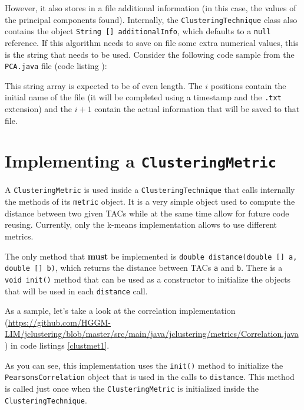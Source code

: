 \documentclass[11pt]{article} %
\begin{document}
However, it also stores in a file additional information (in this case, the values of the principal components found). Internally, the {\tt ClusteringTechnique} class also contains the object {\tt String [] additionalInfo}, which defaults to a {\tt null} reference. If this algorithm needs to save on file some extra numerical values, this is the string that needs to be used. Consider the following code sample from the {\tt PCA.java} file (code listing ):



This string array is expected to be of even length. The $i$ positions contain the initial name of the file (it will be completed using a timestamp and the {\tt .txt} extension) and the $i+1$ contain the actual information that will be saved to that file.

\section{Implementing a {\tt ClusteringMetric}}
\label{sec:clustmet}

A {\tt ClusteringMetric} is used inside a {\tt ClusteringTechnique} that calls internally the methods of its {\tt metric} object. It is a very simple object used to compute the distance between two given TACs while at the same time allow for future code reusing. Currently, only the k-means implementation allows to use different metrics.

The only method that {\bf must} be implemented is {\tt double distance(double [] a, double [] b)}, which returns the distance between TACs {\tt a} and {\tt b}. There is a {\tt void init()} method that can be used as a constructor to initialize the objects that will be used in each {\tt distance} call.

As a sample, let's take a look at the correlation implementation (\url{https://github.com/HGGM-LIM/jclustering/blob/master/src/main/java/jclustering/metrics/Correlation.java}) in code listings \ref{clustmet1}.



As you can see, this implementation uses the {\tt init()} method to initialize the {\tt PearsonsCorrelation} object that is used in the calls to {\tt distance}. This method is called just once when the {\tt ClusteringMetric} is initialized inside the {\tt ClusteringTechnique}.
\end{document}
